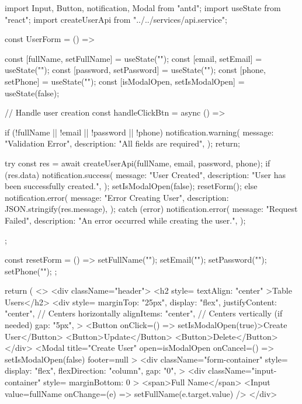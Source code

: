 import { Input, Button, notification, Modal } from "antd";
import { useState } from "react";
import { createUserApi } from "../../services/api.service";

const UserForm = () => {
  const [fullName, setFullName] = useState("");
  const [email, setEmail] = useState("");
  const [password, setPassword] = useState("");
  const [phone, setPhone] = useState("");
  const [isModalOpen, setIsModalOpen] = useState(false);

  // Handle user creation
  const handleClickBtn = async () => {
    if (!fullName || !email || !password || !phone) {
      notification.warning({
        message: "Validation Error",
        description: "All fields are required",
      });
      return;
    }

    try {
      const res = await createUserApi(fullName, email, password, phone);
      if (res.data) {
        notification.success({
          message: "User Created",
          description: "User has been successfully created.",
        });
        setIsModalOpen(false);
        resetForm();
      } else {
        notification.error({
          message: "Error Creating User",
          description: JSON.stringify(res.message),
        });
      }
    } catch (error) {
      notification.error({
        message: "Request Failed",
        description: "An error occurred while creating the user.",
      });
    }
  };

  const resetForm = () => {
    setFullName("");
    setEmail("");
    setPassword("");
    setPhone("");
  };

  return (
    <>
      <div className="header">
        <h2 style={{ textAlign: "center" }}>Table Users</h2>
        <div
          style={{
            marginTop: "25px",
            display: "flex",
            justifyContent: "center", // Centers horizontally
            alignItems: "center", // Centers vertically (if needed)
            gap: "5px",
          }}
        >
          <Button onClick={() => setIsModalOpen(true)}>Create User</Button>
          <Button>Update</Button>
          <Button>Delete</Button>
        </div>
        <Modal
          title="Create User"
          open={isModalOpen}
          onCancel={() => setIsModalOpen(false)}
          footer={null}
        >
          <div
            className="form-container"
            style={{
              display: "flex",
              flexDirection: "column",
              gap: "0",
            }}
          >
            <div className="input-container" style={{ marginBottom: 0 }}>
              <span>Full Name</span>
              <Input
                value={fullName}
                onChange={(e) => setFullName(e.target.value)}
              />
            </div>

}
